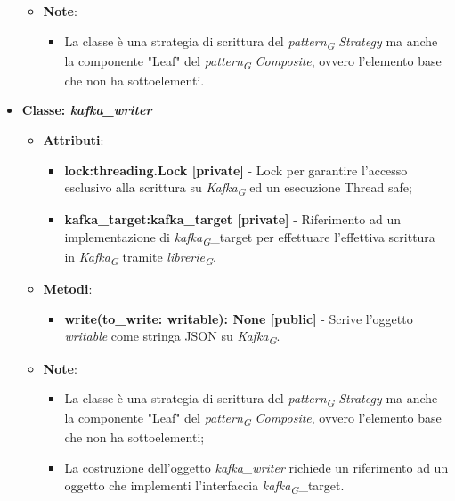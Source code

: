 \begin{itemize}
\begin{itemize}
    \item\textbf{Note}:
        \begin{itemize}
            \item La classe è una strategia di scrittura del \textit{pattern}\textsubscript{\textit{G}} \textit{Strategy} ma anche la componente "Leaf" del \textit{pattern}\textsubscript{\textit{G}} \textit{Composite}, ovvero l'elemento base che non ha sottoelementi.
        \end{itemize}
    \end{itemize}
    \item{\textbf{Classe: \textit{kafka\_writer}}}
    \begin{itemize}
    \item\textbf{Attributi}:
        \begin{itemize}
        \item \textbf{lock:threading.Lock [private]} - Lock per garantire l'accesso esclusivo alla scrittura su \textit{Kafka}\textsubscript{\textit{G}} ed un esecuzione Thread safe;
        \item \textbf{kafka\_target:kafka\_target [private]} - Riferimento ad un implementazione di \textit{kafka}\textsubscript{\textit{G}}\_target per effettuare l'effettiva scrittura in \textit{Kafka}\textsubscript{\textit{G}} tramite \textit{librerie}\textsubscript{\textit{G}}.
    \end{itemize}
    \item \textbf{Metodi}:
    \begin{itemize}
        \item \textbf{write(to\_write: writable): None [public]} - Scrive l'oggetto \textit{writable} come stringa JSON su \textit{Kafka}\textsubscript{\textit{G}}.
    \end{itemize}
    \item\textbf{Note}:
        \begin{itemize}
            \item La classe è una strategia di scrittura del \textit{pattern}\textsubscript{\textit{G}} \textit{Strategy} ma anche la componente "Leaf" del \textit{pattern}\textsubscript{\textit{G}} \textit{Composite}, ovvero l'elemento base che non ha sottoelementi;
            \item La costruzione dell'oggetto \textit{kafka\_writer} richiede un riferimento ad un oggetto che implementi l'interfaccia \textit{kafka}\textsubscript{\textit{G}}\_target.
        \end{itemize}
    \end{itemize}

\end{itemize}
